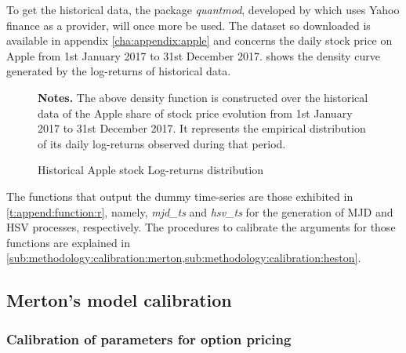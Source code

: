 \documentclass[12pt]{report}
\begin{document}
To get the historical data, the package \textit{quantmod}, developed by \citet{quantmod} which uses Yahoo finance as a provider,  will once more be used. The dataset so downloaded is available in appendix \ref{cha:appendix:apple} and concerns the daily stock price on Apple from 1st January 2017 to 31st December 2017.
 shows the density curve generated by the log-returns of historical data.

\begin{figure}[h]
  \centering
  
  \caption{Historical Apple stock Log-returns distribution}
  \begin{changemargin}{0.5cm}{0.5cm}
  \medskip
\footnotesize
{}\textbf{Notes.} The above density function is constructed over the historical data of the Apple share of stock price evolution from 1st January 2017 to 31st December 2017. 
It represents the empirical distribution of its daily log-returns observed during that period.
  \end{changemargin}
  \label{p:methodology:density:aapl}
\end{figure}

The functions that output the dummy time-series are those exhibited in \cref{t:append:function:r}, namely, \textit{mjd\_ts} and \textit{hsv\_ts} for the generation of  MJD and HSV processes, respectively.
The procedures to calibrate the arguments for those functions are explained in \cref{sub:methodology:calibration:merton,sub:methodology:calibration:heston}.










\subsection{Merton's model calibration}
\label{sub:methodology:calibration:merton}

\subsubsection*{Calibration of parameters for option pricing}
\end{document}
